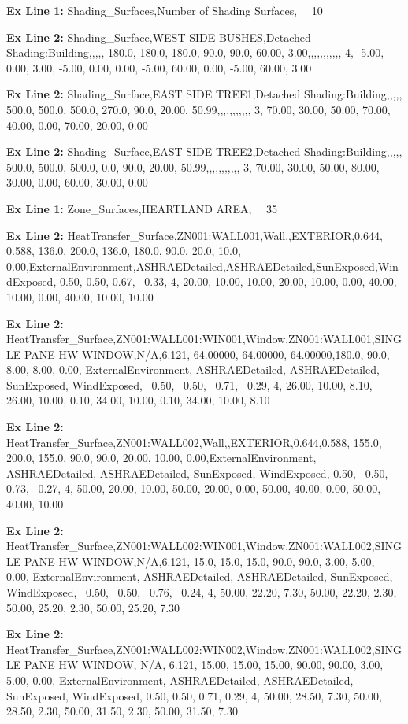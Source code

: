 \textbf{Ex Line 1:} Shading\_Surfaces,Number of Shading Surfaces,~~ 10

\textbf{Ex Line 2:} Shading\_Surface,WEST SIDE BUSHES,Detached Shading:Building,,,,, 180.0, 180.0, 180.0, 90.0, 90.0, 60.00, 3.00,,,,,,,,,,, 4, -5.00, 0.00, 3.00, -5.00, 0.00, 0.00, -5.00, 60.00, 0.00, -5.00, 60.00, 3.00

\textbf{Ex Line 2:} Shading\_Surface,EAST SIDE TREE1,Detached Shading:Building,,,,, 500.0, 500.0, 500.0, 270.0, 90.0, 20.00, 50.99,,,,,,,,,,, 3, 70.00, 30.00, 50.00, 70.00, 40.00, 0.00, 70.00, 20.00, 0.00

\textbf{Ex Line 2:} Shading\_Surface,EAST SIDE TREE2,Detached Shading:Building,,,,, 500.0, 500.0, 500.0, 0.0, 90.0, 20.00, 50.99,,,,,,,,,,, 3, 70.00, 30.00, 50.00, 80.00, 30.00, 0.00, 60.00, 30.00, 0.00

\textbf{Ex Line 1:} Zone\_Surfaces,HEARTLAND AREA,~~ 35

\textbf{Ex Line 2:} HeatTransfer\_Surface,ZN001:WALL001,Wall,,EXTERIOR,0.644, 0.588, 136.0, 200.0, 136.0, 180.0, 90.0, 20.0, 10.0, 0.00,ExternalEnvironment,ASHRAEDetailed,ASHRAEDetailed,SunExposed,WindExposed, 0.50, 0.50, 0.67,~ 0.33, 4, 20.00, 10.00, 10.00, 20.00, 10.00, 0.00, 40.00, 10.00, 0.00, 40.00, 10.00, 10.00

\textbf{Ex Line 2:} HeatTransfer\_Surface,ZN001:WALL001:WIN001,Window,ZN001:WALL001,SINGLE PANE HW WINDOW,N/A,6.121, 64.00000, 64.00000, 64.00000,180.0, 90.0, 8.00, 8.00, 0.00, ExternalEnvironment, ASHRAEDetailed, ASHRAEDetailed, SunExposed, WindExposed,~ 0.50,~ 0.50,~ 0.71,~ 0.29, 4, 26.00, 10.00, 8.10, 26.00, 10.00, 0.10, 34.00, 10.00, 0.10, 34.00, 10.00, 8.10

\textbf{Ex Line 2:} HeatTransfer\_Surface,ZN001:WALL002,Wall,,EXTERIOR,0.644,0.588, 155.0, 200.0, 155.0, 90.0, 90.0, 20.00, 10.00, 0.00,ExternalEnvironment, ASHRAEDetailed, ASHRAEDetailed, SunExposed, WindExposed, 0.50,~ 0.50,~ 0.73,~ 0.27, 4, 50.00, 20.00, 10.00, 50.00, 20.00, 0.00, 50.00, 40.00, 0.00, 50.00, 40.00, 10.00

\textbf{Ex Line 2:} HeatTransfer\_Surface,ZN001:WALL002:WIN001,Window,ZN001:WALL002,SINGLE PANE HW WINDOW,N/A,6.121, 15.0, 15.0, 15.0, 90.0, 90.0, 3.00, 5.00,~ 0.00, ExternalEnvironment, ASHRAEDetailed, ASHRAEDetailed, SunExposed, WindExposed,~ 0.50,~ 0.50,~ 0.76,~ 0.24, 4, 50.00, 22.20, 7.30, 50.00, 22.20, 2.30, 50.00, 25.20, 2.30, 50.00, 25.20, 7.30

\textbf{Ex Line 2:} HeatTransfer\_Surface,ZN001:WALL002:WIN002,Window,ZN001:WALL002,SINGLE PANE HW WINDOW, N/A, 6.121, 15.00, 15.00, 15.00, 90.00, 90.00, 3.00, 5.00, 0.00, ExternalEnvironment, ASHRAEDetailed, ASHRAEDetailed, SunExposed, WindExposed, 0.50, 0.50, 0.71, 0.29, 4, 50.00, 28.50, 7.30, 50.00, 28.50, 2.30, 50.00, 31.50, 2.30, 50.00, 31.50, 7.30

